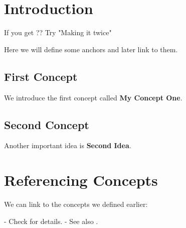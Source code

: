 \documentclass{article}
\begin{document}
\section{Introduction}

If you get ?? Try "Making it twice"

Here we will define some anchors and later link to them.

\subsection{First Concept}

We introduce the first concept called \textbf{My Concept One}.

\lipsum[1]
\newpage

\subsection{Second Concept}

Another important idea is \textbf{Second Idea}.

\lipsum[2]
\newpage

\section{Referencing Concepts}

We can link to the concepts we defined earlier:

- Check  for details.  
- See also .

\lipsum[3]
\end{document}
